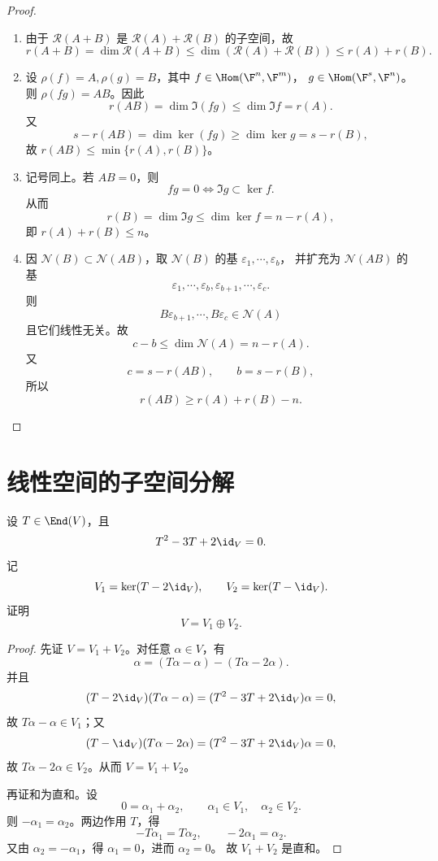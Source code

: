 \begin{proof}
	\begin{enumerate}
	\item 由于 $\mathcal{R}(A+B)$ 是 $\mathcal{R}(A)+\mathcal{R}(B)$ 的子空间，故
	\[
	r(A+B)=\dim\mathcal{R}(A+B)
	\leq \dim(\mathcal{R}(A)+\mathcal{R}(B))
	\leq r(A)+r(B).
	\]
	\item 设 $\rho(f)=A,\rho(g)=B$，其中
	$f\in\Hom(\F^n,\F^m)$，
	$g\in\Hom(\F^s,\F^n)$。则 $\rho(fg)=AB$。因此
	\[
	r(AB)=\dim\Im(fg)
	\leq\dim\Im f=r(A).
	\]
	又
	\[
	s-r(AB)=\dim\ker(fg)
	\geq\dim\ker g=s-r(B),
	\]
	故 $r(AB)\leq \min\{r(A),r(B)\}$。
	\item 记号同上。若 $AB=0$，则
	\[
	fg=0
	\Longleftrightarrow
	\Im g\subset\ker f.
	\]
	从而
	\[
	r(B)=\dim\Im g
	\leq \dim\ker f=n-r(A),
	\]
	即 $r(A)+r(B)\leq n$。
	\item 因 $\mathcal{N}(B)\subset\mathcal{N}(AB)$，取
	$\mathcal{N}(B)$ 的基 $\varepsilon_1,\cdots,\varepsilon_b$，
	并扩充为 $\mathcal{N}(AB)$ 的基
	\[
	\varepsilon_1,\cdots,\varepsilon_b,
	\varepsilon_{b+1},\cdots,\varepsilon_c.
	\]
	则
	\[
	B\varepsilon_{b+1},\cdots,B\varepsilon_c\in\mathcal{N}(A)
	\]
	且它们线性无关。故
	\[
	c-b\leq \dim\mathcal{N}(A)=n-r(A).
	\]
	又
	\[
	c=s-r(AB),
	\qquad
	b=s-r(B),
	\]
	所以
	\[
	r(AB)\geq r(A)+r(B)-n.
	\]
\end{enumerate}
\end{proof}

\section{线性空间的子空间分解}

\begin{example}
	设 $T\in\End(V)$，且
	\[
	T^2-3T+2\id_V=0.
	\]
	记
	\[
	V_1=\ker(T-2\id_V),
	\qquad
	V_2=\ker(T-\id_V).
	\]
	证明
	\[
	V=V_1\oplus V_2.
	\]
\end{example}

\begin{proof}
	先证 $V=V_1+V_2$。对任意 $\alpha\in V$，有
	\[
	\alpha=(T\alpha-\alpha)-(T\alpha-2\alpha).
	\]
	并且
	\[
	(T-2\id_V)(T\alpha-\alpha)
	=(T^2-3T+2\id_V)\alpha=0,
	\]
	故 $T\alpha-\alpha\in V_1$；又
	\[
	(T-\id_V)(T\alpha-2\alpha)
	=(T^2-3T+2\id_V)\alpha=0,
	\]
	故 $T\alpha-2\alpha\in V_2$。从而 $V=V_1+V_2$。
	
	再证和为直和。设
	\[
	0=\alpha_1+\alpha_2,
	\qquad
	\alpha_1\in V_1,
	\quad
	\alpha_2\in V_2.
	\]
	则 $-\alpha_1=\alpha_2$。两边作用 $T$，得
	\[
	-T\alpha_1=T\alpha_2,
	\qquad
	-2\alpha_1=\alpha_2.
	\]
	又由 $\alpha_2=-\alpha_1$，得 $\alpha_1=0$，进而 $\alpha_2=0$。
	故 $V_1+V_2$ 是直和。
\end{proof}

